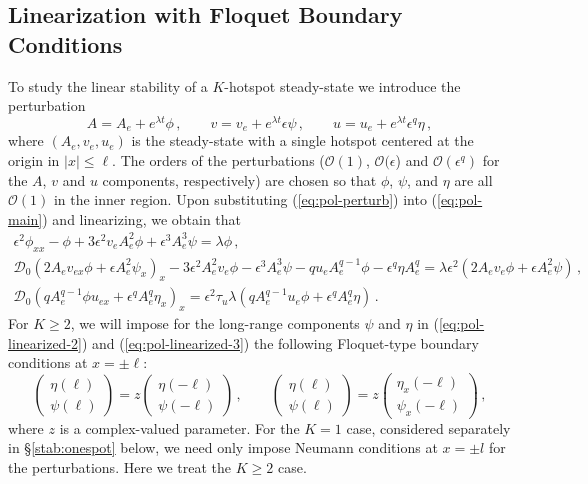 \documentclass{article}%
\newcommand{\bsub}{\begin{subequations}}
\newcommand{\esub}{\end{subequations}$\!$}
\begin{document}
\subsection{Linearization with Floquet Boundary Conditions}

To study the linear stability of a $K$-hotspot steady-state we
introduce the perturbation 
\begin{equation}
A=A_{e}+e^{\lambda t}\phi \,,\qquad v=v_{e}+e^{\lambda t}\epsilon\psi\,,
\qquad u=u_{e}+e^{\lambda t}\epsilon^{q}\eta\,, \label{eq:pol-perturb}
\end{equation}
where $(A_{e},v_{e},u_{e})$ is the steady-state with a single hotspot
centered at the origin in $|x|\leq \ell$.  The orders of the
perturbations (${\mathcal O}(1)$, ${\mathcal O}(\epsilon$) and
${\mathcal O}(\epsilon^{q})$ for the $A$, $v$ and $u$ components,
respectively) are chosen so that $\phi$, $\psi$, and $\eta$ are all
${\mathcal O}(1)$ in the inner region.  Upon substituting
(\ref{eq:pol-perturb}) into (\ref{eq:pol-main}) and linearizing, we
obtain that 
\bsub\label{eq:pol-linearized}
\begin{gather}
\epsilon^{2}\phi_{xx}-\phi+3\epsilon^{2}v_{e}A_{e}^{2}\phi+
\epsilon^{3}A_{e}^{3}\psi  =\lambda\phi\,, \label{eq:pol-linearized-1}\\ 
{\mathcal D}_{0}\left(2A_{e}v_{ex}\phi+\epsilon A_{e}^{2}\psi_{x}\right)_{x} 
-3\epsilon^{2}A_{e}^{2}v_{e}\phi-\epsilon^{3}A_{e}^{3}\psi 
-qu_{e}A_{e}^{q-1}\phi-\epsilon^{q}\eta A_{e}^{q} 
=\lambda\epsilon^{2}\left(2A_{e}v_{e}\phi+\epsilon
A_{e}^{2}\psi\right)\,, \label{eq:pol-linearized-2}\\ 
{\mathcal D}_{0}\left(qA_{e}^{q-1}\phi u_{ex}+\epsilon^{q}A_{e}^{q}\eta_{x}
\right)_{x} 
=\epsilon^{2}\tau_{u}\lambda\left(qA_{e}^{q-1}u_{e}\phi+\epsilon^{q}
A_{e}^{q}\eta\right)\,.
\label{eq:pol-linearized-3}
\end{gather}
\esub For $K\geq 2$, we will impose for the long-range components
$\psi$ and $\eta$ in (\ref{eq:pol-linearized-2}) and
(\ref{eq:pol-linearized-3}) the following Floquet-type boundary
conditions at $x=\pm\ell$:
\begin{equation}
\left(\begin{array}{c}
\eta(\ell)\\
\psi(\ell)
\end{array}\right)=z\left(\begin{array}{c}
\eta(-\ell)\\
\psi(-\ell)
\end{array}\right)\,, \qquad\left(\begin{array}{c}
\eta(\ell)\\
\psi(\ell)
\end{array}\right)=z\left(\begin{array}{c}
\eta_{x}(-\ell)\\
\psi_{x}(-\ell)
\end{array}\right)\,,\label{eq:pol-floquet-bc}
\end{equation}
where $z$ is a complex-valued parameter.   For the $K=1$ case,
considered separately in \S \ref{stab:onespot} below, we need only
impose Neumann conditions at $x=\pm l$ for the perturbations. Here we
treat the $K\geq 2$ case.
\end{document}
